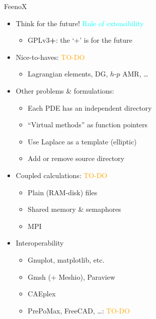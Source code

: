 \documentclass[
  ignorenonframetext,
  aspectratio=169,
]{beamer}
\providecommand{\tightlist}{%
  \setlength{\itemsep}{0pt}\setlength{\parskip}{0pt}}
\begin{document}
\begin{frame}{}
\begin{columns}[T]
\pause

\begin{column}{0.5\textwidth}
\begin{exampleblock}{FeenoX}
\protect\hypertarget{feenox-6}{}
\begin{itemize}
\tightlist
\item
  Think for the future! {\textcolor{cyan}{Rule of {extensibility}}}

  \begin{itemize}
  \tightlist
  \item
    GPLv3\textbf{+}: the `+' is for the future
  \end{itemize}
\item
  Nice-to-haves: \textcolor{Orange}{TO-DO}

  \begin{itemize}
  \tightlist
  \item
    Lagrangian elements, DG, \(h\)-\(p\) AMR, \ldots{}
  \end{itemize}
\item
  Other problems \& formulations:

  \begin{itemize}
  \tightlist
  \item
    Each PDE has an independent directory
  \item
    ``Virtual methods'' as function pointers
  \item
    Use Laplace as a template (elliptic)
  \item
    Add or remove source directory
  \end{itemize}
\item
  Coupled calculations: \textcolor{Orange}{TO-DO}

  \begin{itemize}
  \tightlist
  \item
    Plain (RAM-disk) files
  \item
    Shared memory \& semaphores
  \item
    MPI
  \end{itemize}
\item
  Interoperability

  \begin{itemize}
  \tightlist
  \item
    Gnuplot, matplotlib, etc.
  \item
    Gmsh (+ Meshio), Paraview
  \item
    CAEplex
  \item
    PrePoMax, FreeCAD, \ldots: \textcolor{Orange}{TO-DO}
  \end{itemize}
\end{itemize}
\end{exampleblock}
\end{column}
\end{columns}
\end{frame}
\end{document}
